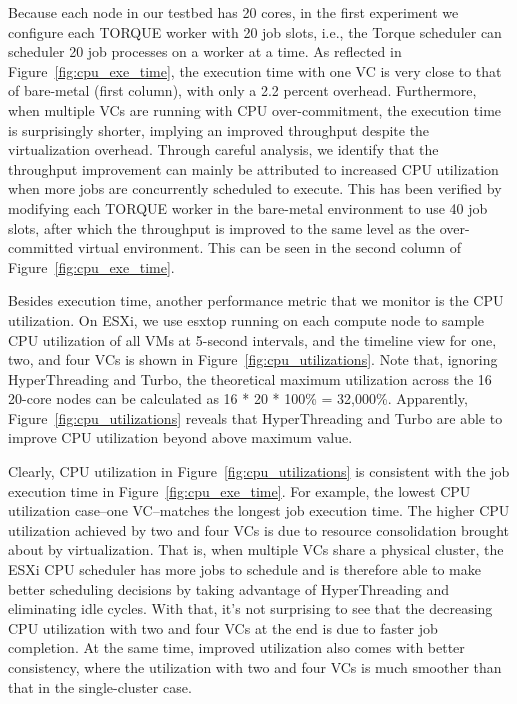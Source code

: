 Because each node in our testbed has 20 cores, in the first experiment we configure each TORQUE worker with 20 job slots, i.e., the Torque scheduler can scheduler 20 job processes on a worker at a time. As reflected in Figure~\ref{fig:cpu_exe_time}, the execution time with one VC is very close to that of bare-metal (first column), with only a 2.2 percent overhead. Furthermore, when multiple VCs are running with CPU over-commitment, the execution time is surprisingly shorter, implying an improved throughput despite the virtualization overhead. Through careful analysis, we identify that the throughput improvement can mainly be attributed to increased CPU utilization when more jobs are concurrently scheduled to execute. This has been verified by modifying each TORQUE worker in the bare-metal environment to use 40 job slots, after which the throughput is improved to the same level as the over-committed virtual environment. This can be seen in the second column of Figure~\ref{fig:cpu_exe_time}.

Besides execution time, another performance metric that we monitor is the CPU utilization. On ESXi, we use esxtop running on each compute node to sample CPU utilization of all VMs at 5-second intervals, and the timeline view for one, two, and four VCs is shown in Figure~\ref{fig:cpu_utilizations}. 
Note that, ignoring HyperThreading and Turbo, the theoretical maximum utilization across the 16 20-core nodes can 
be calculated as 16 * 20 * 100\% = 32,000\%. Apparently, Figure~\ref{fig:cpu_utilizations} reveals that HyperThreading and Turbo 
are able to improve CPU utilization beyond above maximum value. 

Clearly, CPU utilization in Figure~\ref{fig:cpu_utilizations} is consistent with the job execution time in Figure~\ref{fig:cpu_exe_time}. For example, the lowest CPU utilization case--one VC--matches the longest job execution time. 
The higher CPU utilization achieved by two and four VCs is due to resource consolidation brought about by virtualization. That is, when multiple VCs share a physical cluster, the ESXi CPU scheduler has more jobs to schedule and is therefore able to make better scheduling decisions by taking advantage of HyperThreading and eliminating idle cycles. 
With that, it's not surprising to see that the decreasing CPU utilization with two and four VCs at the end is due to faster job completion. 
At the same time, improved utilization also comes with better consistency, where the utilization with two and four VCs is much smoother than that in the single-cluster case.

